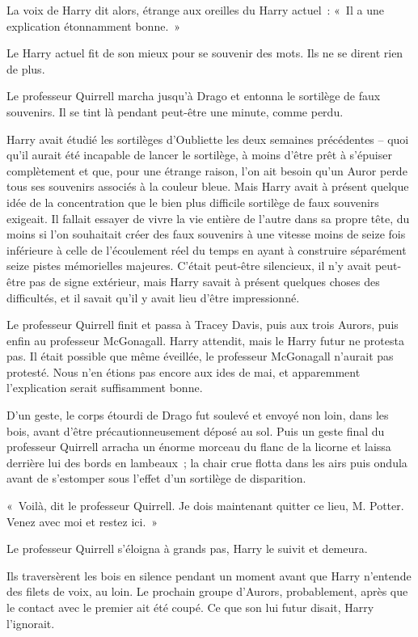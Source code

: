 La voix de Harry dit alors, étrange aux oreilles du Harry actuel~: «~Il a une explication étonnamment bonne.~»

Le Harry actuel fit de son mieux pour se souvenir des mots.
Ils ne se dirent rien de plus.

Le professeur Quirrell marcha jusqu'à Drago et entonna le sortilège de faux souvenirs.
Il se tint là pendant peut-être une minute, comme perdu.

Harry avait étudié les sortilèges d'Oubliette les deux semaines précédentes -- quoi qu'il aurait été incapable de lancer le sortilège, à moins d'être prêt à s'épuiser complètement et que, pour une étrange raison, l'on ait besoin qu'un Auror perde tous ses souvenirs associés à la couleur bleue.
Mais Harry avait à présent quelque idée de la concentration que le bien plus difficile sortilège de faux souvenirs exigeait.
Il fallait essayer de vivre la vie entière de l'autre dans sa propre tête, du moins si l'on souhaitait créer des faux souvenirs à une vitesse moins de seize fois inférieure à celle de l'écoulement réel du temps en ayant à construire séparément seize pistes mémorielles majeures.
C'était peut-être silencieux, il n'y avait peut-être pas de signe extérieur, mais Harry savait à présent quelques choses des difficultés, et il savait qu'il y avait lieu d'être impressionné.

Le professeur Quirrell finit et passa à Tracey Davis, puis aux trois Aurors, puis enfin au professeur McGonagall.
Harry attendit, mais le Harry futur ne protesta pas.
Il était possible que même éveillée, le professeur McGonagall n'aurait pas protesté.
Nous n'en étions pas encore aux ides de mai, et apparemment l'explication serait suffisamment bonne.

D'un geste, le corps étourdi de Drago fut soulevé et envoyé non loin, dans les bois, avant d'être précautionneusement déposé au sol.
Puis un geste final du professeur Quirrell arracha un énorme morceau du flanc de la licorne et laissa derrière lui des bords en lambeaux~; la chair crue flotta dans les airs puis ondula avant de s'estomper sous l'effet d'un sortilège de disparition.

«~Voilà, dit le professeur Quirrell.
Je dois maintenant quitter ce lieu, M. Potter.
Venez avec moi et restez ici.~»

Le professeur Quirrell s'éloigna à grands pas, Harry le suivit et demeura.

Ils traversèrent les bois en silence pendant un moment avant que Harry n'entende des filets de voix, au loin.
Le prochain groupe d'Aurors, probablement, après que le contact avec le premier ait été coupé.
Ce que son lui futur disait, Harry l'ignorait.

